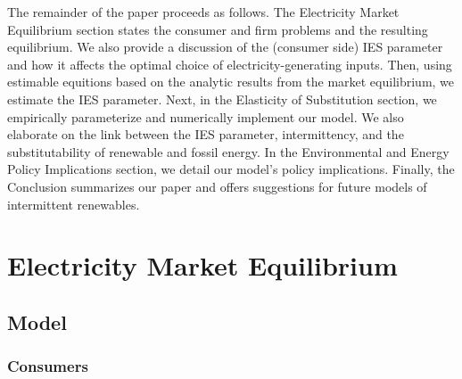 \documentclass[11pt,a4paper,leqno]{extarticle}
\begin{document}
	
	The remainder of the paper proceeds as follows. The Electricity Market Equilibrium section  states the consumer and firm problems and the resulting equilibrium. We also provide a discussion of the (consumer side) IES parameter and how it affects the optimal choice of electricity-generating inputs. Then, using estimable equitions based on the analytic results from the market equilibrium, we estimate the IES parameter. Next, in the Elasticity of Substitution section,  we  empirically parameterize and numerically implement our model. We also elaborate on the link between the IES parameter, intermittency, and the substitutability of renewable and fossil energy. In the Environmental and Energy Policy Implications section, we detail our model's policy implications. Finally, the Conclusion summarizes our paper and offers suggestions for future models of intermittent renewables.
	
	
	
	
	\section{Electricity Market Equilibrium}
	\subsection{Model}
	\label{sec:Model}
	
	\subsubsection{Consumers}
	\label{sec:consumers}
	
\end{document}
